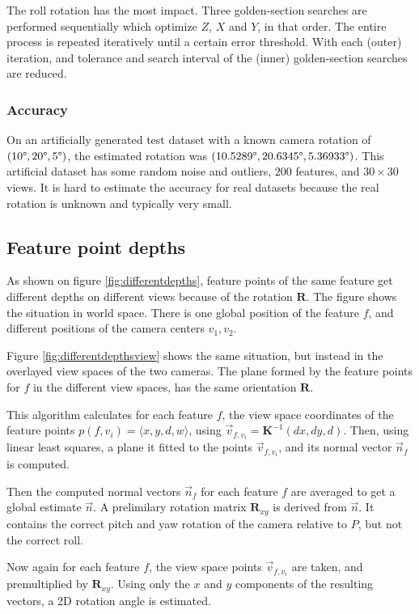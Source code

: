 \documentclass{scrreprt}
\newcommand{\matr}[1]{\mathbf{#1}}
\newcommand{\degr}{\text{\textdegree}}
\begin{document}
The roll rotation has the most impact. Three golden-section searches are performed sequentially which optimize $Z$, $X$ and $Y$, in that order. The entire process is repeated iteratively until a certain error threshold. With each (outer) iteration, and tolerance and search interval of the (inner) golden-section searches are reduced.

\subsubsection{Accuracy}
On an artificially generated test dataset with a known camera rotation of $(10\degr, 20\degr, 5\degr)$, the estimated rotation was $(10.5289\degr, 20.6345\degr, 5.36933\degr)$. This artificial dataset has some random noise and outliers, $200$ features, and $30 \times 30$ views. It is hard to estimate the accuracy for real datasets because the real rotation is unknown and typically very small.

\pagebreak

\subsection{Feature point depths}
\label{sec:depthrot}
As shown on figure \ref{fig:differentdepths}, feature points of the same feature get different depths on different views because of the rotation $\matr{R}$. The figure shows the situation in world space. There is one global position of the feature $f$, and different positions of the camera centers $v_1, v_2$.

Figure \ref{fig:differentdepthsview} shows the same situation, but instead in the overlayed view spaces of the two cameras. The plane formed by the feature points for $f$ in the different view spaces, has the same orientation $\matr{R}$.

This algorithm calculates for each feature $f$, the view space coordinates of the feature points $p(f,v_i) = \langle x,y,d,w\rangle$, using $\vec{v}_{f,v_i} = \matr{K}^{-1} (d x, d y, d)$. Then, using linear least squares, a plane it fitted to the points $\vec{v}_{f,v_i}$, and its normal vector $\vec{n}_f$ is computed.

Then the computed normal vectors $\vec{n}_f$ for each feature $f$ are averaged to get a global estimate $\vec{n}$. A prelimilary rotation matrix $\matr{R}_{xy}$ is derived from $\vec{n}$. It contains the correct pitch and yaw rotation of the camera relative to $P$, but not the correct roll.

Now again for each feature $f$, the view space points $\vec{v}_{f,v_i}$ are taken, and premultiplied by $\matr{R}_{xy}$. Using only the $x$ and $y$ components of the resulting vectors, a 2D rotation angle is estimated.
\end{document}
